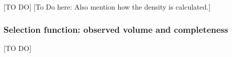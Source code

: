 


[TO DO] [To Do here: Also mention how the density is calculated.]

\subsubsection{Selection function: observed volume and completeness}

[TO DO]
